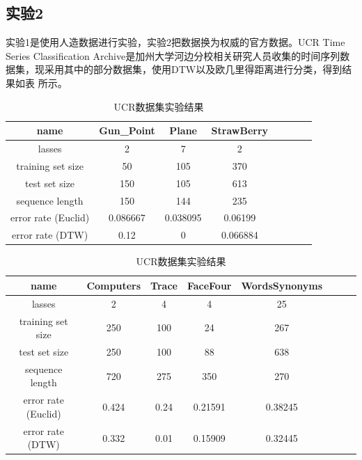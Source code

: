 \subsection{实验2}
实验1是使用人造数据进行实验，实验2把数据换为权威的官方数据。UCR Time Series Classification Archive是加州大学河边分校相关研究人员收集的时间序列数据集\cite{UCR_data}，现采用其中的部分数据集，使用DTW以及欧几里得距离进行分类，得到结果如表 所示。

\begin{table}[ht]
\centering
\begin{tabular}{|c|c|c|c|c|c|c|c|}
    \hline
    name & Gun\_Point & Plane & StrawBerry \\
    \hline
    lasses & 2 & 7 & 2 \\
    \hline
    training set size  & 50 & 105 & 370 \\
    \hline
    test set size  & 150 & 105 & 613 \\
    \hline
    sequence length & 150 & 144 & 235 \\
    \hline
    error rate (Euclid) & 0.086667 & 0.038095 & 0.06199 \\
    \hline
    error rate (DTW) & 0.12 & 0 & 0.066884 \\
    \hline
\end{tabular}
\newline
\newline
\newline
\begin{tabular}{|c|c|c|c|c|c|c|c|}
    \hline
    name & Computers & Trace & FaceFour & WordsSynonyms\\
    \hline
    lasses & 2 & 4 & 4 & 25  \\
    \hline
    training set size & 250 & 100 & 24 & 267  \\
    \hline
    test set size & 250 & 100 & 88 & 638  \\
    \hline
    sequence length & 720 & 275 & 350 & 270  \\
    \hline
    error rate (Euclid) & 0.424 & 0.24 & 0.21591 & 0.38245 \\
    \hline
    error rate (DTW) & 0.332 & 0.01 & 0.15909 & 0.32445  \\
    \hline
\end{tabular} \caption{UCR数据集实验结果 } \label{tab:1}
\end{table}

